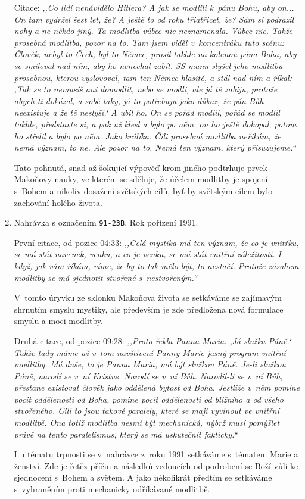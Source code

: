 \begin{enumerate}
{    Citace: \textit{%
      ,,Co lidí nenávidělo Hitlera? A jak se modlili k~pánu Bohu, aby on... On tam
      vydržel šest let, že? A ještě to od roku třiatřicet, že? Sám si podrazil
      nohy a ne někdo jiný. Ta modlitba vůbec nic neznamenala. Vůbec nic. Takže
      prosebná modlitba, pozor na to. Tam jsem viděl v~koncentráku tuto scénu:
      Člověk, nebyl to Čech, byl to Němec, prosil takhle na kolenou pána Boha,
      aby se smiloval nad ním, aby ho nenechal zabít. SS-mann slyšel jeho
      modlitbu prosebnou, kterou vyslovoval, tam ten Němec hlasitě, a stál nad
      ním a říkal: ,Tak se to nemusíš ani domodlit, nebo se modli, ale já tě
      zabiju, protože abych ti dokázal, a sobě taky, já to potřebuju jako důkaz,
      že pán Bůh neexistuje a že tě neslyší.` A ubil ho. On se pořád modlil,
      pořád se modlil takhle, představte si, a pak už klesl a bylo po něm, on ho
      ještě dokopal, potom ho střelil a bylo po něm. Jako králíka. Čili prosebná
      modlitba neříkám, že nemá význam, to ne. Ale pozor na to. Nemá ten význam,
      který přisuzujeme.``
    }

    Tato pohnutá, snad až šokující výpověď krom jiného podtrhuje prvek
    Makoňovy nauky, ve kterém se sděluje, že účelem modlitby je spojení s~Bohem
    a nikoliv dosažení světských cílů, byť by světským cílem bylo zachování
    holého života.
  }
  \item{
    Nahrávka s označením \texttt{91-23B}.
    Rok pořízení 1991.

    První citace, od pozice 04:33: \textit{%
      ,,Celá mystika má ten význam, že co je vnitřku, se má stát navenek, venku, a
      co je venku, se má stát vnitřní záležitostí. I když, jak vám říkám, víme,
      že by to tak mělo být, to nestačí. Protože zásahem modlitby se má
      sjednotit stvořené s~nestvořeným.``
    }

    V~tomto úryvku ze sklonku Makoňova života se setkáváme se zajímavým shrnutím
    smyslu mystiky, ale především je zde předložena nová formulace smyslu a moci
    modlitby.

    Druhá citace, od pozice 09:28: \textit{%
      ,,Proto řekla Panna Maria: ,Já služka Páně.` Takže tady máme už v~tom
      navštívení Panny Marie jasný program vnitřní modlitby. Má duše, to je
      Panna Maria, má být služkou Páně. Je-li služkou Páně, narodí se v~ní
      Kristus. Narodí se v~ní Bůh. Narodil-li se v~ní Bůh, přestane existovat
      člověk jako oddělená bytost od Boha. Jestliže v~něm pomine pocit
      oddělenosti od Boha, pomine pocit oddělenosti od bližního a od všeho
      stvořeného. Čili to jsou takové paralely, které se mají vyvinout ve
      vnitřní modlitbě. Ona totiž modlitba nesmí být mechanická, nýbrž musí
      pomýšlet právě na tento paralelismus, který se má uskutečnit fakticky.``
    }

    I u tématu trpnosti se v~nahrávce z~roku 1991 setkáváme s~tématem Marie a
    ženství. Zde je řetěz příčin a následků vedoucích od podrobení se Boží vůli
    ke sjednocení s~Bohem a světem. A jako několikrát předtím se setkáváme
    s~vyhraněním proti mechanicky odříkávané modlitbě.
  }
\end{enumerate}

